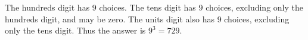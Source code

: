 The hundreds digit has $9$ choices. The tens digit has $9$ choices, excluding only the hundreds digit, and may be zero. The units digit also has $9$ choices, excluding only the tens digit. Thus the answer is $\boxed{9^3=729}$.
